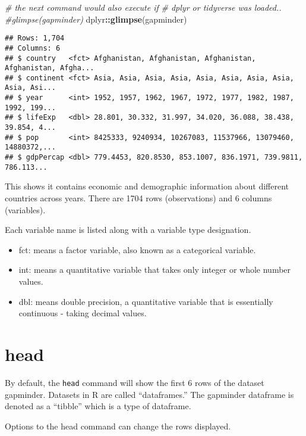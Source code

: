 \documentclass[
]{book}
\newenvironment{Shaded}{\begin{snugshade}}{\end{snugshade}}
\newcommand{\CommentTok}[1]{\textcolor[rgb]{0.56,0.35,0.01}{\textit{#1}}}
\newcommand{\KeywordTok}[1]{\textcolor[rgb]{0.13,0.29,0.53}{\textbf{#1}}}
\newcommand{\NormalTok}[1]{#1}
\newcommand{\OperatorTok}[1]{\textcolor[rgb]{0.81,0.36,0.00}{\textbf{#1}}}
\providecommand{\tightlist}{%
  \setlength{\itemsep}{0pt}\setlength{\parskip}{0pt}}
\begin{document}
\begin{Shaded}
\begin{Highlighting}[]
\CommentTok{# the next command would also execute if}
\CommentTok{# dplyr or tidyverse was loaded..}
\CommentTok{#glimpse(gapminder)}
\NormalTok{dplyr}\OperatorTok{::}\KeywordTok{glimpse}\NormalTok{(gapminder)}
\end{Highlighting}
\end{Shaded}

\begin{verbatim}
## Rows: 1,704
## Columns: 6
## $ country   <fct> Afghanistan, Afghanistan, Afghanistan, Afghanistan, Afgha...
## $ continent <fct> Asia, Asia, Asia, Asia, Asia, Asia, Asia, Asia, Asia, Asi...
## $ year      <int> 1952, 1957, 1962, 1967, 1972, 1977, 1982, 1987, 1992, 199...
## $ lifeExp   <dbl> 28.801, 30.332, 31.997, 34.020, 36.088, 38.438, 39.854, 4...
## $ pop       <int> 8425333, 9240934, 10267083, 11537966, 13079460, 14880372,...
## $ gdpPercap <dbl> 779.4453, 820.8530, 853.1007, 836.1971, 739.9811, 786.113...
\end{verbatim}

This shows it contains economic and demographic information about different countries across years. There are 1704 rows (observations) and 6 columns (variables).

Each variable name is listed along with a variable type designation.

\begin{itemize}
\tightlist
\item
  fct: means a factor variable, also known as a categorical variable.
\item
  int: means a quantitative variable that takes only integer or whole number values.
\item
  dbl: means double precision, a quantitative variable that is essentially continuous - taking decimal values.
\end{itemize}

\hypertarget{head}{%
\section{head}\label{head}}

By default, the \texttt{head} command will show the first 6 rows of the dataset gapminder. Datasets in R are called ``dataframes.'' The gapminder dataframe is denoted as a ``tibble'' which is a type of dataframe.

Options to the head command can change the rows displayed.
\end{document}
